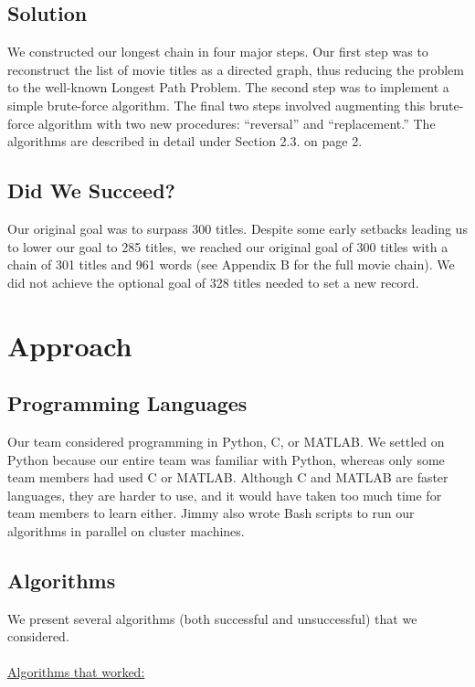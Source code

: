 \documentclass[11pt,english]{article}
\begin{document}
\subsection{Solution}
We constructed our longest chain in four major steps. Our first step was to
reconstruct the list of movie titles as a directed graph, thus reducing the
problem to the well-known Longest Path Problem. The second step was to
implement a simple brute-force algorithm. The final two steps involved
augmenting this brute-force algorithm with two new procedures: ``reversal'' and
``replacement.'' The algorithms are described in detail under Section 2.3. on
page 2.

\subsection{Did We Succeed?}
Our original goal was to surpass 300 titles. Despite some early setbacks
leading us to lower our goal to 285 titles, we reached our original goal of 300
titles with a chain of 301 titles and 961 words (see Appendix B for the full movie chain).
We did not achieve the optional goal of 328 titles needed to set a new record.

\section{Approach}

%
\subsection{Programming Languages}
Our team considered programming in Python, C, or MATLAB. We
settled on Python because our entire team was familiar with Python, whereas
only some team members had used C or MATLAB. Although C and MATLAB are faster
languages, they are harder to use, and it would have taken too much time for
team members to learn either. Jimmy also wrote Bash scripts to run our
algorithms in parallel on cluster machines.

\subsection{Algorithms}
We present several algorithms (both successful and unsuccessful) that we
considered.\\\\
\underline{Algorithms that worked:}
\end{document}

